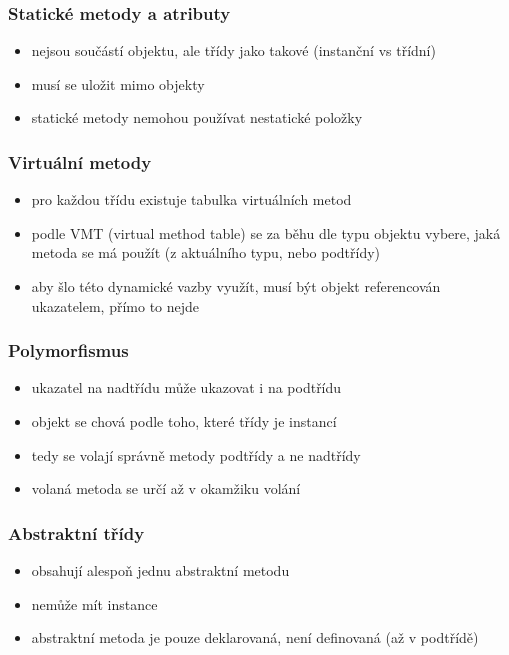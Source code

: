 \subsubsection*{Statické metody a atributy}
\begin{itemize}
	\item nejsou součástí objektu, ale třídy jako takové (instanční vs třídní)
	\item musí se uložit mimo objekty
	\item statické metody nemohou používat nestatické položky
\end{itemize}

\subsubsection*{Virtuální metody}
\begin{itemize}
	\item pro každou třídu existuje tabulka virtuálních metod
	\item podle VMT (virtual method table) se za běhu dle typu objektu vybere, jaká metoda se má použít (z aktuálního typu, nebo podtřídy)
	\item aby šlo této dynamické vazby využít, musí být objekt referencován ukazatelem, přímo to nejde
\end{itemize}

\subsubsection*{Polymorfismus}
\begin{itemize}
	\item ukazatel na nadtřídu může ukazovat i na podtřídu
	\item objekt se chová podle toho, které třídy je instancí
	\item tedy se volají správně metody podtřídy a ne nadtřídy
	\item volaná metoda se určí až v okamžiku volání
\end{itemize}

\subsubsection*{Abstraktní třídy}
\begin{itemize}
	\item obsahují alespoň jednu abstraktní metodu
	\item nemůže mít instance
	\item abstraktní metoda je pouze deklarovaná, není definovaná (až v podtřídě)
\end{itemize}


